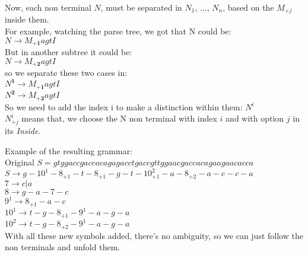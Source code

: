 	Now, each non terminal $N$, must be separated in $N_1$, ..., $N_n$, based on 
	the $M_{+j}$ inside them. \\

		For example, watching the parse tree, we got that N could be:\\

	$N \rightarrow M_{+\textbf{1}} agt I$\\

	But in another subtree it could be: \\

	$N \rightarrow M_{+\textbf{2}} agt I$ \\

	so we separate these two cases in: \\

	$N^\textbf{1} \rightarrow M_{+\textbf{1}} agt I$\\

	$N^\textbf{2} \rightarrow M_{+\textbf{2}} agt I$ \\

	So we need to add the index i to make a distinction within them: $N^i$\\


	$N^i_{+j}$ means that, we choose the N non terminal with index $i$ and with option
	$j$ in its \emph{Inside}.\\

	\newpage

	Example of the resulting grammar: \\

	Original $S = gtggaccgaccacagagacctgaccgttggaacgaccacagaagaacacca$\\

	$S \rightarrow g - 10^1 - 8_{+1} - t - 8_{+1} - g - t - 10^2_{+1} - a - 8_{+2} - a - c - c - a$ \\

	$7 \rightarrow c | a$\\

	$8 \rightarrow g - a - 7 - c$ \\

 	$9^1 \rightarrow 8_{+1} - a - c$ \\

	$10^1 \rightarrow t - g - 8_{+1} - 9^1 - a - g - a$ \\

	$10^2 \rightarrow t - g - 8_{+2} - 9^1 - a - g - a$\\


	With all these new symbols added, there's no ambiguity, so we can just follow
	the non terminals and unfold them. \\ 

